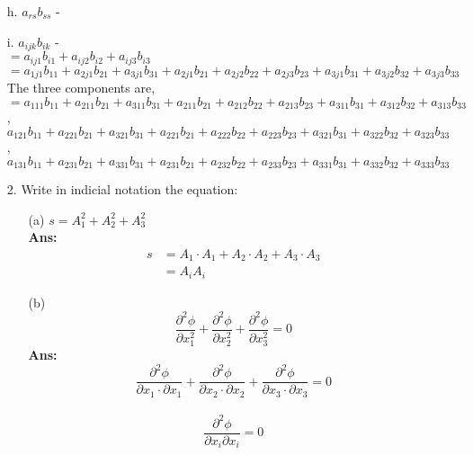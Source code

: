 \documentclass[a4paper,12pt]{article}
\begin{document}
\begin{enumerate}
    \item[h.] $a_{rs}b_{ss}$ - \textbf{} \\
    
    \item[i.] $a_{ijk}b_{ik}$ - \textbf{} \\
    $= a_{ij1}b_{i1} + a_{ij2}b_{i2} + a_{ij3}b_{i3}$ \\
    $= a_{1j1}b_{11} + a_{2j1}b_{21} + a_{3j1}b_{31} + a_{2j1}b_{21} + a_{2j2}b_{22} +         a_{2j3}b_{23} + a_{3j1}b_{31} + a_{3j2}b_{32} + a_{3j3}b_{33}$\\
    
    The three components are,\\
    $= a_{111}b_{11} + a_{211}b_{21} + a_{311}b_{31} + a_{211}b_{21} + a_{212}b_{22} +         a_{213}b_{23} + a_{311}b_{31} + a_{312}b_{32} + a_{313}b_{33}$,\\
    
    $ a_{121}b_{11} + a_{221}b_{21} + a_{321}b_{31} + a_{221}b_{21} + a_{222}b_{22} +         a_{223}b_{23} + a_{321}b_{31} + a_{322}b_{32} + a_{323}b_{33}$,\\
    
    $ a_{131}b_{11} + a_{231}b_{21} + a_{331}b_{31} + a_{231}b_{21} + a_{232}b_{22} +         a_{233}b_{23} + a_{331}b_{31} + a_{332}b_{32} + a_{333}b_{33}$\\
\end{enumerate}


\begin{enumerate}
\item[2.]{Write in indicial notation the equation:}
    \begin{itemize}
        \item[(a)] \( s = A_1^2 + A_2^2 + A_3^2 \)\\[6pt]
        \textbf{Ans:}
        \begin{align*}
            s &= A_1 \cdot A_1 + A_2 \cdot A_2 + A_3 \cdot A_3 \\
              &= A_i A_i
        \end{align*}
        
        \item[(b)] 
        \[
        \frac{\partial^2 \phi}{\partial x_1^2} + \frac{\partial ^2 \phi}{\partial x_2^2} + \frac{\partial^2 \phi}{\partial x_3^2}=0
        \]
        \textbf{Ans:}
        \[
          {\frac{\partial^2 \phi}{\partial x_1\cdot\partial x_1 } + \frac{\partial ^2 \phi}{\partial x_2\cdot \partial x_2} + \frac{\partial^2 \phi}{\partial x_3 \cdot \partial x_3}=0}\] \\ 
        \[{\frac{\partial^2 \phi}{\partial x_i \partial x_i}=0}
        \]
          
    \end{itemize}
\end{enumerate}
\end{document}
